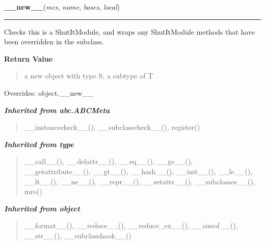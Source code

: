 \hspace{.8\funcindent}\begin{boxedminipage}{\funcwidth}

    \raggedright \textbf{\_\_new\_\_}(\textit{mcs}, \textit{name}, \textit{bases}, \textit{local})

    \vspace{-1.5ex}

    \rule{\textwidth}{0.5\fboxrule}
\setlength{\parskip}{2ex}
    Checks this is a ShutItModule, and wraps any ShutItModule methods that 
    have been overridden in the subclass.

\setlength{\parskip}{1ex}
      \textbf{Return Value}
    \vspace{-1ex}

      \begin{quote}
      a new object with type S, a subtype of T

      \end{quote}

      Overrides: object.\_\_new\_\_

    \end{boxedminipage}


\large{\textbf{\textit{Inherited from abc.ABCMeta}}}

\begin{quote}
\_\_instancecheck\_\_(), \_\_subclasscheck\_\_(), register()
\end{quote}

\large{\textbf{\textit{Inherited from type}}}

\begin{quote}
\_\_call\_\_(), \_\_delattr\_\_(), \_\_eq\_\_(), \_\_ge\_\_(), \_\_getattribute\_\_(), \_\_gt\_\_(), \_\_hash\_\_(), \_\_init\_\_(), \_\_le\_\_(), \_\_lt\_\_(), \_\_ne\_\_(), \_\_repr\_\_(), \_\_setattr\_\_(), \_\_subclasses\_\_(), mro()
\end{quote}

\large{\textbf{\textit{Inherited from object}}}

\begin{quote}
\_\_format\_\_(), \_\_reduce\_\_(), \_\_reduce\_ex\_\_(), \_\_sizeof\_\_(), \_\_str\_\_(), \_\_subclasshook\_\_()
\end{quote}


